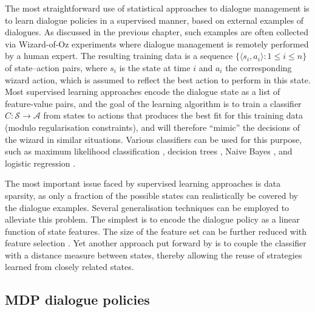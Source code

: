 The most straightforward use of statistical approaches to dialogue management is to learn dialogue policies in a supervised manner, based on external examples of dialogues.  As discussed in the previous chapter, such examples are often collected via Wizard-of-Oz experiments where dialogue management is remotely performed by a human expert.  The resulting training data is a sequence $\{\langle s_i, a_i \rangle : 1 \leq i \leq n\}$ of state--action pairs, where $s_i$ is the state at time $i$ and $a_i$ the corresponding wizard action, which is assumed to reflect the best action to perform in this state.  Most supervised learning approaches encode the dialogue state as a list of feature-value pairs, and the goal of the learning algorithm is to train a classifier $C: \mathcal{S} \rightarrow \mathcal{A}$  from states to actions that produces the best fit for this training data (modulo regularisation constraints), and will therefore ``mimic'' the decisions of the wizard in similar situations. Various classifiers can be used for this purpose, such as maximum likelihood classification \citep{Hurtado:2005}, decision trees \citep{LaneKU04}, Naive Bayes \citep{williams2003}, and logistic regression \citep{rieser2006,Passonneau2012}.  

The most important issue faced by supervised learning approaches is data sparsity, as only a fraction of the possible states can realistically be covered by the dialogue examples.  Several generalisation techniques can be employed to alleviate this problem.  The simplest is to encode the dialogue policy as a linear function of state features. The size of the feature set can be further reduced with feature selection \citep{Passonneau2012}. Yet another approach put forward by \cite{Hurtado:2005} is to couple the classifier with a distance measure between states, thereby allowing the reuse of strategies learned from closely related states.


\subsection{MDP dialogue policies}

